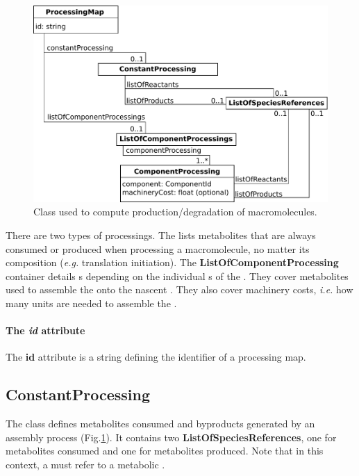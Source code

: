 \begin{figure}
  \centering
  \includegraphics[scale=0.8]{figures/processes_processing_map}
  \caption{Class used to compute production/degradation of macromolecules.}
\label{fig:processes_processing_map}
\end{figure}

There are two types of processings.
The \constantprocessing{} lists metabolites that are always consumed or
produced when processing a macromolecule, no matter its composition
(\textit{e.g.} translation initiation).
The \textbf{ListOfComponentProcessing} container details
\componentprocessing{}s depending on the individual
\component{}s of the \macromolecule{}.
They cover metabolites used to assemble the \component{} onto the nascent
\macromolecule{}.
They also cover machinery costs, \textit{i.e.} how many \machinery{} units
are needed to assemble the \component{}.

\paragraph{The \textit{id} attribute}
The \textbf{id} attribute is a string defining the identifier of a
processing map.


\subsection{ConstantProcessing}
\label{sec:constant_processing}

The \constantprocessing{} class defines metabolites consumed and byproducts
generated by an assembly process (Fig.\ref{fig:processes_processing_map}).
It contains two \textbf{ListOfSpeciesReferences}, one for metabolites
consumed and one for metabolites produced.
Note that in this context, a \speciesreference{} must refer to a
metabolic \species.


